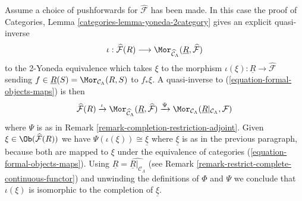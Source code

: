 \begin{remark}
\medskip\noindent
Assume a choice of pushforwards for $\widehat{\mathcal{F}}$ has been made.
In this case the proof of
Categories, Lemma \ref{categories-lemma-yoneda-2category}
gives an explicit quasi-inverse
$$
\iota :
\widehat{\mathcal{F}}(R) \longrightarrow
\Mor_{\widehat{\mathcal{C}}_\Lambda}(
\underline{R}, \widehat{\mathcal{F}})
$$
to the 2-Yoneda equivalence which takes $\xi$ to the morphism
$\iota(\xi) : \underline{R} \to \widehat{\mathcal{F}}$ sending
$f \in \underline{R}(S) = \Mor_{\mathcal{C}_\Lambda}(R, S)$
to $f_*\xi$. A quasi-inverse to (\ref{equation-formal-objects-maps})
is then
$$
\widehat{\mathcal{F}}(R)
\xrightarrow{\iota}
\Mor_{\widehat{\mathcal{C}}_\Lambda}(
\underline{R}, \widehat{\mathcal{F}})
\xrightarrow{\Psi}
\Mor_{\mathcal{C}_\Lambda}(
\underline{R}|_{\mathcal{C}_\Lambda}, \mathcal{F})
$$
where $\Psi$ is as in
Remark \ref{remark-completion-restriction-adjoint}.
Given $\xi \in \Ob(\widehat{\mathcal{F}}(R))$ we have
$\Psi(\iota(\xi)) \cong \underline{\xi}$ where $\underline{\xi}$
is as in the previous paragraph, because both are mapped to $\xi$
under the equivalence of categories (\ref{equation-formal-objects-maps}).
Using $\underline{R} = \widehat{\underline{R}|_{\mathcal{C}_\Lambda}}$
(see Remark \ref{remark-restrict-complete-continuous-functor})
and unwinding the definitions of $\Phi$ and $\Psi$ we conclude that
$\iota(\xi)$ is isomorphic to the completion of $\underline{\xi}$.
\end{remark}

